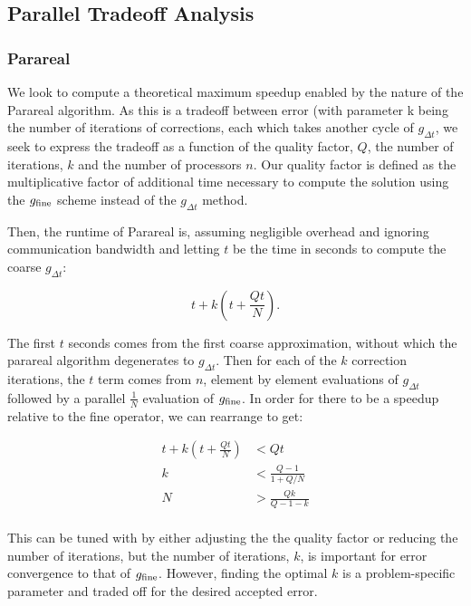 \documentclass[letterpaper,12pt]{article}
\begin{document}
\subsection{Parallel Tradeoff Analysis}

\subsubsection{Parareal}

We look to compute a theoretical maximum speedup enabled by the nature of the Parareal algorithm.  As this is a tradeoff between error (with parameter k being the number of iterations of corrections, each which takes another cycle of $g_{\Delta t}$, we seek to express the tradeoff as a function of the quality factor, $Q$, the number of iterations, $k$ and the number of processors $n$.  Our quality factor is defined as the multiplicative factor of additional time necessary to compute the solution using the $g_{\textnormal{fine}}$ scheme instead of the $g_{\Delta t}$ method.

Then, the runtime of Parareal is, assuming negligible overhead and ignoring communication bandwidth and letting $t$ be the time in seconds to compute the coarse $g_{\Delta t}$:

\begin{equation}
t + k \left(t + \frac{Qt}{N} \right).
\end{equation}

The first $t$ seconds comes from the first coarse approximation, without which the parareal algorithm degenerates to $g_{\Delta t}$.  Then for each of the $k$ correction iterations, the $t$ term comes from $n$, element by element evaluations of  $g_{\Delta t}$ followed by a parallel $\frac{1}{N}$ evaluation of $g_{\textnormal{fine}}$. In order for there to be a speedup relative to the fine operator, we can rearrange to get:

\[
\begin{aligned}
t + k\left( t + \frac{Qt}{N} \right) &< Qt \\
k &< \frac{Q - 1}{1 + Q/N} \\
N &> \frac{Qk}{Q - 1 - k} \\
\end{aligned}
\]

This can be tuned with by either adjusting the the quality factor or reducing the number of iterations, but the number of iterations, $k$, is important for error convergence to that of $g_{\textnormal{fine}}$.  However, finding the optimal $k$ is a problem-specific parameter and traded off for the desired accepted error.
\end{document}
